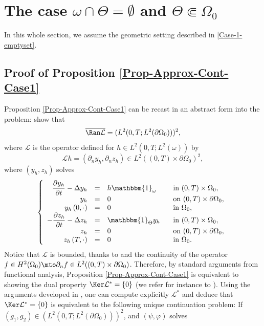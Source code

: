 \section{The case \texorpdfstring{$\omega \cap \Theta = \emptyset$ and $\Theta \Subset \Omega_0$}{om}}
\label{Sec-Omega-Theta-Empty}
In this whole section, we assume the geometric setting described in \eqref{Case-1-emptyset}.

\subsection{Proof of Proposition \ref{Prop-Approx-Cont-Case1}}\label{Subsec-Proof-ApproxCont-Case1}
Proposition \ref{Prop-Approx-Cont-Case1} can be recast in an abstract form into the problem: show that
\[
\overline{ \Ran \mathcal{L} } = (L^2(0,T; L^2(\partial\Omega_0)))^2,
\]
where $\mathcal{L}$ is the operator defined for $h \in L^2(0,T; L^2(\omega))$ by
\[
\mathcal{L} h = (\partial_n y_h, \partial_n z_h)\in L^2((0,T)\times\partial\Omega_0)^2,
\]
where $(y_h,z_h)$ solves
\begin{equation}\label{csanss}
\left\{
\begin{array}{rcll}
\dfrac{\partial y_h}{\partial t}-\Delta y_h &=&h\mathbbm{1}_{\omega}\quad&\text{ in }(0,T) \times \Omega_0,
\\
y_h &=& 0 &\text{ on }(0,T) \times \partial \Omega_0,
\\
y_h\left(0,\cdot\right) &=& 0 &\text{ in }\Omega_0,
\\
-\dfrac{\partial z_h}{\partial t}-\Delta z_h &=&\mathbbm{1}_{\Theta}y_h &\text{ in }(0,T) \times \Omega_0,
\\
z_h &=& 0 &\text{ on }(0,T) \times \partial \Omega_0,
\\
z_h\left(T,\cdot\right) &=& 0 &\text{ in }\Omega_0.
\end{array}
\right.
\end{equation}
Notice that $\mathcal L$ is bounded, thanks to \cite[Th.\,5, p.\,382]{Evans} and the continuity of the operator $f\in H^2(\Omega_0) \mto \partial_n f\in L^2((0,T)\times\partial\Omega_0)$.
Therefore, by standard arguments from functional analysis, Proposition \ref{Prop-Approx-Cont-Case1} is equivalent to showing the dual property $\Ker\mathcal{L}^* = \{0\}$ (we refer for instance to \cite[Cor.\,2.18]{Brezis}). Using the arguments developed in \cite[Prop.\,2.1]{Lissy-Privat-Simpore}, one can compute explicitly $\mathcal L^*$ and deduce that $\Ker\mathcal{L}^* = \{0\}$ is equivalent to the following unique continuation problem: If $(g_1, g_2) \in (L^2(0,T; L^2(\partial\Omega_0)))^2$, and $(\psi, \varphi)$ solves
